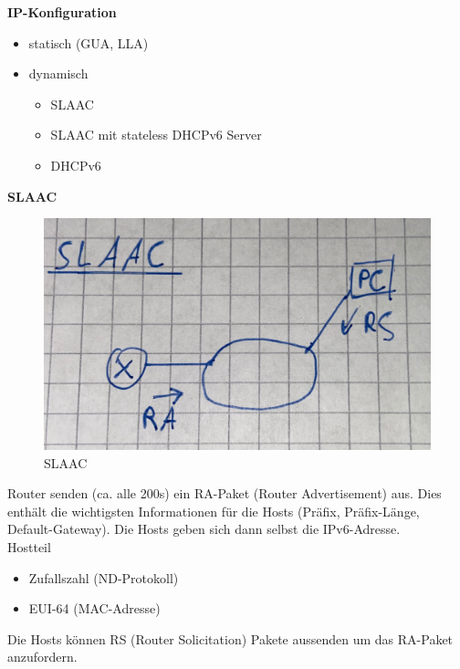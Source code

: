 \textbf{IP-Konfiguration}
\begin{itemize}
	\item statisch (GUA, LLA)
	\item dynamisch
	\begin{itemize}
		\item SLAAC
		\item SLAAC mit stateless DHCPv6 Server
		\item DHCPv6
	\end{itemize}
\end{itemize}

\textbf{SLAAC} \\
\begin{figure}[H]
	\centering
	\includegraphics[width=0.8\linewidth]{figures/slaac.jpeg}
	\caption{SLAAC}
\end{figure}
Router senden (ca. alle 200s) ein RA-Paket (Router Advertisement) aus. Dies enthält die wichtigsten Informationen für die Hosts (Präfix, Präfix-Länge, Default-Gateway). Die Hosts geben sich dann selbst die IPv6-Adresse. \\
Hostteil
\begin{itemize}
	\item Zufallszahl (ND-Protokoll)
	\item EUI-64 (MAC-Adresse)
\end{itemize}
Die Hosts können RS (Router Solicitation) Pakete aussenden um das RA-Paket anzufordern.



